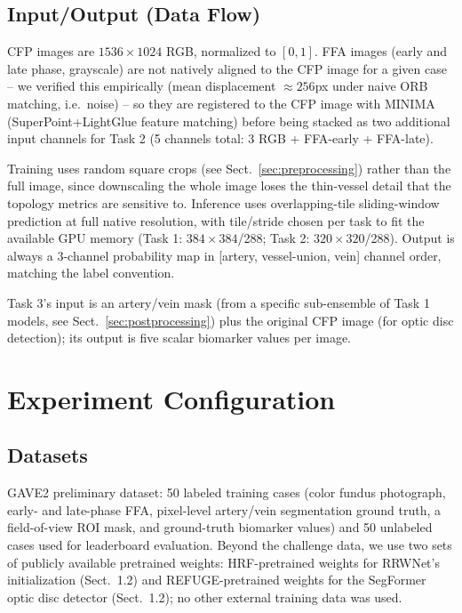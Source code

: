 \documentclass[runningheads]{llncs}
\begin{document}
\subsection{Input/Output (Data Flow)}

CFP images are $1536\times1024$ RGB, normalized to $[0,1]$. FFA images
(early and late phase, grayscale) are not natively aligned to the CFP image
for a given case -- we verified this empirically (mean displacement
$\approx256$px under naive ORB matching, i.e.\ noise) -- so they are
registered to the CFP image with MINIMA \cite{ren2025minima}
(SuperPoint+LightGlue feature matching) before being stacked as two
additional input channels for Task 2 (5 channels total: 3 RGB + FFA-early +
FFA-late).

Training uses random square crops (see Sect.~\ref{sec:preprocessing}) rather
than the full image, since downscaling the whole image loses the thin-vessel
detail that the topology metrics are sensitive to. Inference uses
overlapping-tile sliding-window prediction at full native resolution, with
tile/stride chosen per task to fit the available GPU memory (Task 1:
$384\times384$/288; Task 2: $320\times320$/288). Output is always a
3-channel probability map in [artery, vessel-union, vein] channel order,
matching the label convention.

Task 3's input is an artery/vein mask (from a specific sub-ensemble of Task 1
models, see Sect.~\ref{sec:postprocessing}) plus the original CFP image (for
optic disc detection); its output is five scalar biomarker values per image.

%
\section{Experiment Configuration}

\subsection{Datasets}
GAVE2 preliminary dataset: 50 labeled training cases (color fundus
photograph, early- and late-phase FFA, pixel-level artery/vein segmentation
ground truth, a field-of-view ROI mask, and ground-truth biomarker values)
and 50 unlabeled cases used for leaderboard evaluation. Beyond the challenge
data, we use two sets of publicly available pretrained weights: HRF-pretrained
weights for RRWNet's initialization (Sect.~1.2) and REFUGE-pretrained
weights for the SegFormer optic disc detector (Sect.~1.2); no other
external training data was used.
\end{document}
